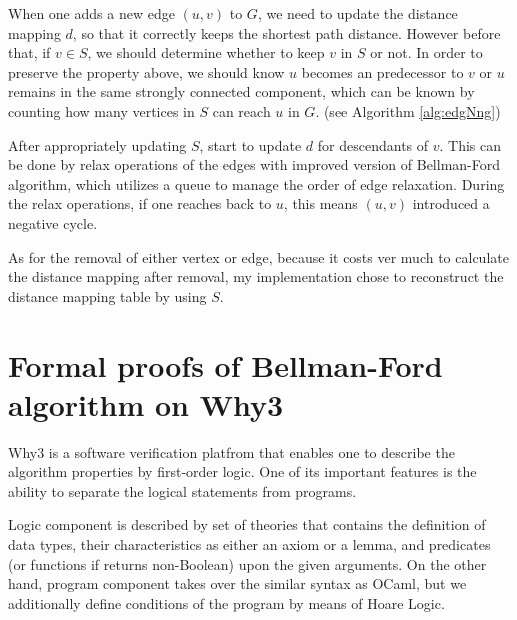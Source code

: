 \documentclass[a4paper,12pt]{article}
\begin{document}
When one adds a new edge $(u,v)$ to $G$, we need to update the
distance mapping $d$, so that it correctly keeps the shortest path
distance. However before that, if $v\in S$, we should determine
whether to keep $v$ in $S$ or not. In order to preserve the property
above, we should know $u$ becomes an predecessor to $v$ or $u$ remains
in the same strongly connected component, which can be known by
counting how many vertices in $S$ can reach $u$ in $G$. (see Algorithm
\ref{alg:edgNng})

After appropriately updating $S$, start to update $d$ for descendants
of $v$. This can be done by relax operations of the edges with
improved version of Bellman-Ford algorithm, which utilizes a queue to
manage the order of edge relaxation. During the relax operations, if one
reaches back to $u$, this means $(u, v)$ introduced a negative cycle.

\begin{algorithm}
\caption{$\ensuremath{\mbox{\sc Add-Edge}}(G,S,d,u,v)$}\label{alg:edgNng}
\begin{algorithmic}[1]
\ENDIF
\ENDIF
{}
\end{algorithmic}
\end{algorithm}

As for the removal of either vertex or edge, because it costs ver much
to calculate the distance mapping after removal, my implementation
chose to reconstruct the distance mapping table by using $S$.

\section{Formal proofs of Bellman-Ford algorithm on Why3}

Why3 \cite{boogie11why3} is a software verification platfrom that
enables one to describe the algorithm properties by first-order
logic. One of its important features is the ability to separate the
logical statements from programs.

Logic component is described by set of theories that contains the
definition of data types, their characteristics as either an axiom or
a lemma, and predicates (or functions if returns non-Boolean) upon the
given arguments. On the other hand, program component takes over the
similar syntax as OCaml, but we additionally define conditions of the
program by means of Hoare Logic.
\end{document}
